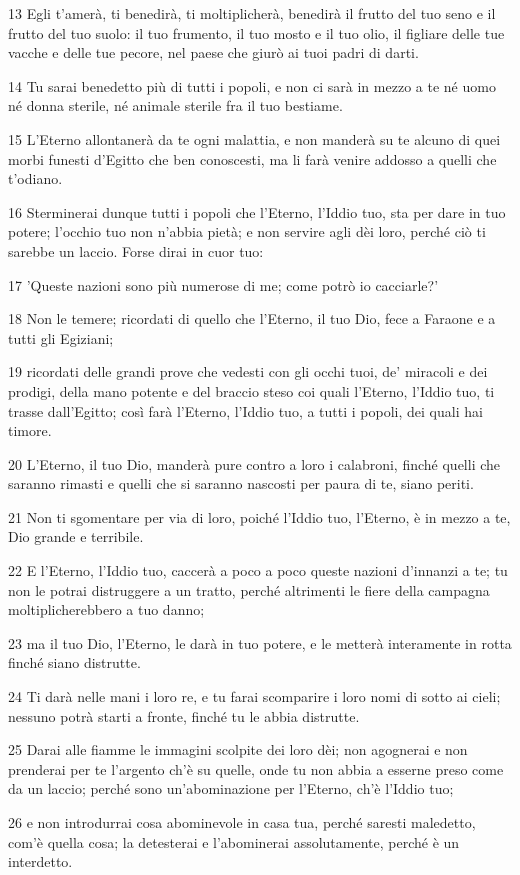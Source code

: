\par 13 Egli t'amerà, ti benedirà, ti moltiplicherà, benedirà il frutto del tuo seno e il frutto del tuo suolo: il tuo frumento, il tuo mosto e il tuo olio, il figliare delle tue vacche e delle tue pecore, nel paese che giurò ai tuoi padri di darti.
\par 14 Tu sarai benedetto più di tutti i popoli, e non ci sarà in mezzo a te né uomo né donna sterile, né animale sterile fra il tuo bestiame.
\par 15 L'Eterno allontanerà da te ogni malattia, e non manderà su te alcuno di quei morbi funesti d'Egitto che ben conoscesti, ma li farà venire addosso a quelli che t'odiano.
\par 16 Sterminerai dunque tutti i popoli che l'Eterno, l'Iddio tuo, sta per dare in tuo potere; l'occhio tuo non n'abbia pietà; e non servire agli dèi loro, perché ciò ti sarebbe un laccio. Forse dirai in cuor tuo:
\par 17 'Queste nazioni sono più numerose di me; come potrò io cacciarle?'
\par 18 Non le temere; ricordati di quello che l'Eterno, il tuo Dio, fece a Faraone e a tutti gli Egiziani;
\par 19 ricordati delle grandi prove che vedesti con gli occhi tuoi, de' miracoli e dei prodigi, della mano potente e del braccio steso coi quali l'Eterno, l'Iddio tuo, ti trasse dall'Egitto; così farà l'Eterno, l'Iddio tuo, a tutti i popoli, dei quali hai timore.
\par 20 L'Eterno, il tuo Dio, manderà pure contro a loro i calabroni, finché quelli che saranno rimasti e quelli che si saranno nascosti per paura di te, siano periti.
\par 21 Non ti sgomentare per via di loro, poiché l'Iddio tuo, l'Eterno, è in mezzo a te, Dio grande e terribile.
\par 22 E l'Eterno, l'Iddio tuo, caccerà a poco a poco queste nazioni d'innanzi a te; tu non le potrai distruggere a un tratto, perché altrimenti le fiere della campagna moltiplicherebbero a tuo danno;
\par 23 ma il tuo Dio, l'Eterno, le darà in tuo potere, e le metterà interamente in rotta finché siano distrutte.
\par 24 Ti darà nelle mani i loro re, e tu farai scomparire i loro nomi di sotto ai cieli; nessuno potrà starti a fronte, finché tu le abbia distrutte.
\par 25 Darai alle fiamme le immagini scolpite dei loro dèi; non agognerai e non prenderai per te l'argento ch'è su quelle, onde tu non abbia a esserne preso come da un laccio; perché sono un'abominazione per l'Eterno, ch'è l'Iddio tuo;
\par 26 e non introdurrai cosa abominevole in casa tua, perché saresti maledetto, com'è quella cosa; la detesterai e l'abominerai assolutamente, perché è un interdetto.

